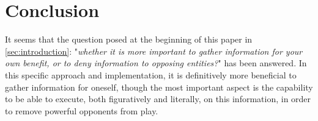 \section{Conclusion}\label{sec:conclusion}
It seems that the question posed at the beginning of this paper in
\cref{sec:introduction}: "\textit{whether it is more important to gather
    information for your own benefit, or to deny information to opposing
    entities?}" has been answered. In this specific approach and implementation, it
is definitively more beneficial to gather information for oneself, though the
most important aspect is the capability to be able to execute, both
figuratively and literally, on this information, in order to remove powerful
opponents from play.